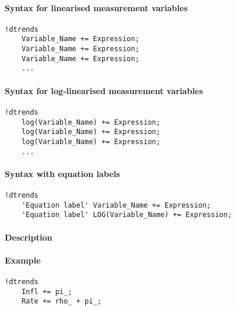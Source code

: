 


	\paragraph{Syntax for linearised measurement
variables}

\begin{verbatim}
!dtrends
    Variable_Name += Expression;
    Variable_Name += Expression;
    Variable_Name += Expression;
    ...
\end{verbatim}

\paragraph{Syntax for log-linearised measurement
variables}

\begin{verbatim}
!dtrends
    log(Variable_Name) += Expression;
    log(Variable_Name) += Expression;
    log(Variable_Name) += Expression;
    ...
\end{verbatim}

\paragraph{Syntax with equation
labels}

\begin{verbatim}
!dtrends
    'Equation label' Variable_Name += Expression;
    'Equation label' LOG(Variable_Name) += Expression;
\end{verbatim}

\paragraph{Description}

\paragraph{Example}

\begin{verbatim}
!dtrends
    Infl += pi_;
    Rate += rho_ + pi_;
\end{verbatim}


